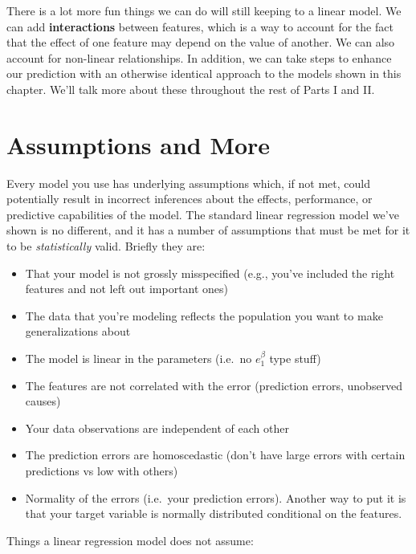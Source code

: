 \documentclass[
  letterpaper,
]{krantz}
\providecommand{\tightlist}{%
  \setlength{\itemsep}{0pt}\setlength{\parskip}{0pt}}\usepackage{longtable,booktabs,array}
\begin{document}
There is a lot more fun things we can do will still keeping to a linear
model. We can add \textbf{interactions} between features, which is a way
to account for the fact that the effect of one feature may depend on the
value of another. We can also account for non-linear relationships. In
addition, we can take steps to enhance our prediction with an otherwise
identical approach to the models shown in this chapter. We'll talk more
about these throughout the rest of Parts I and II.

\section{Assumptions and More}\label{sec-lm-assumptions}

Every model you use has underlying assumptions which, if not met, could
potentially result in incorrect inferences about the effects,
performance, or predictive capabilities of the model. The standard
linear regression model we've shown is no different, and it has a number
of assumptions that must be met for it to be \emph{statistically} valid.
Briefly they are:

\begin{itemize}
\tightlist
\item
  That your model is not grossly misspecified (e.g., you've included the
  right features and not left out important ones)
\item
  The data that you're modeling reflects the population you want to make
  generalizations about
\item
  The model is linear in the parameters (i.e.~no \(e^\beta_1\) type
  stuff)
\item
  The features are not correlated with the error (prediction errors,
  unobserved causes)
\item
  Your data observations are independent of each other
\item
  The prediction errors are homoscedastic (don't have large errors with
  certain predictions vs low with others)
\item
  Normality of the errors (i.e.~your prediction errors). Another way to
  put it is that your target variable is normally distributed
  conditional on the features.
\end{itemize}

Things a linear regression model does not assume:
\end{document}
